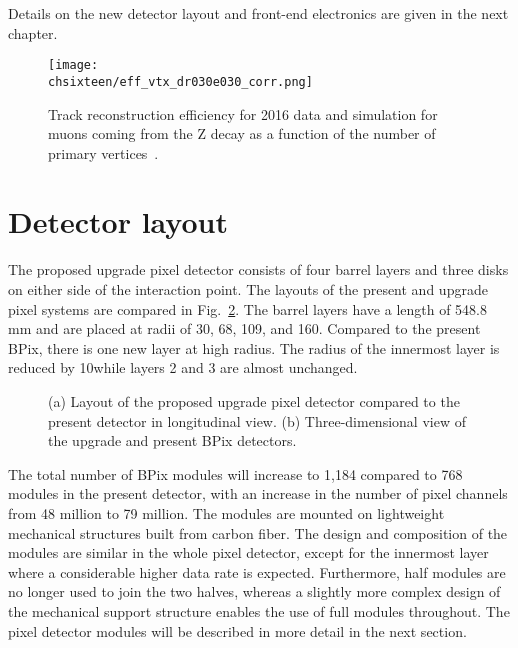 Details on the new detector layout and front-end electronics are given in the next chapter.

\begin{figure}[!htb]
 \begin{center}
 \texttt{[image: \\chsixteen/eff\_vtx\_dr030e030\_corr.png]}
 \end{center}
 \caption{Track reconstruction efficiency for 2016 data and simulation for muons coming from the Z decay as a function of the number of primary vertices~\cite{TrkCMSPublicResults}.}
 \label{fig:trackEffPix}
\end{figure}

\section{Detector layout}

The proposed upgrade pixel detector consists of four barrel layers and three disks on either side of the interaction point.
The layouts of the present and upgrade pixel systems are compared in Fig.~\ref{fig:Phase1Layout}.
The barrel layers have a length of 548.8 mm and are placed at radii of 30, 68, 109, and 160\mm. Compared to the present BPix, there is one new layer at high radius.
The radius of the innermost layer is reduced by 10\mm while layers 2 and 3 are almost unchanged. 

\begin{figure}[!htb]
 \begin{center}
 \hspace{0.2cm}
 \end{center}
 \caption{(a) Layout of the proposed upgrade pixel detector compared to the present detector in longitudinal view. (b) Three-dimensional view of the upgrade and present BPix detectors.}
 \label{fig:Phase1Layout}
\end{figure}

The total number of BPix modules will increase to 1,184 compared to 768 modules in the present detector, with an increase in the number of pixel channels from 48 million to 79 million.
The modules are mounted on lightweight mechanical structures built from carbon fiber.
The design and composition of the modules are similar in the whole pixel detector, except for the innermost layer where a considerable higher data rate is expected.
Furthermore, half modules are no longer used to join the two halves, whereas a slightly more complex design of the mechanical support structure enables the use of full modules throughout.
The pixel detector modules will be described in more detail in the next section.

